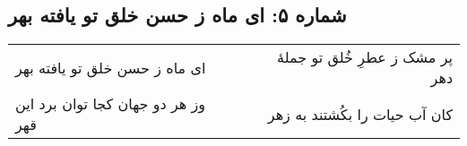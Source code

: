 \begin{center}
\section*{شماره ۵: ای ماه ز حسن خلق تو یافته بهر}
\label{sec:005}
\begin{longtable}{l p{0.5cm} r}
ای ماه ز حسن خلق تو یافته بهر
&&
پر مشک ز عطرِ خُلق تو جملهٔ دهر
\\
وز هر دو جهان کجا توان برد این قهر
&&
کان آب حیات را بکُشتند به زهر
\\
\end{longtable}
\end{center}
